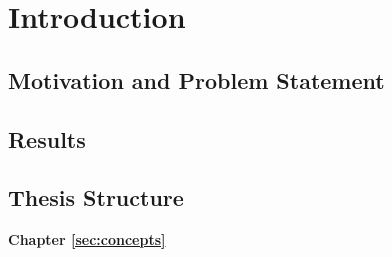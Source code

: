 %
\chapter{Introduction}
\label{sec:intro}

\section{Motivation and Problem Statement}
\label{sec:intro:motivation}

\section{Results}
\label{sec:intro:results}

\section{Thesis Structure}
\label{sec:intro:structure}

\textbf{Chapter \ref{sec:concepts}} \\[0.2em]
